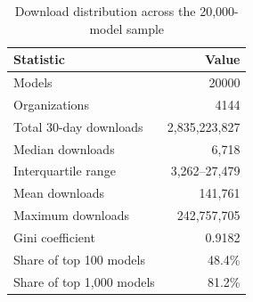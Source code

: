 \begin{table}[t]
\caption{Download distribution across the 20,000-model sample}
\label{tab:descriptives}
\centering
\small
\begin{tabular}{lr}
\toprule
Statistic & Value \\
\midrule
Models & 20000 \\
Organizations & 4144 \\
Total 30-day downloads & 2,835,223,827 \\
Median downloads & 6,718 \\
Interquartile range & 3,262--27,479 \\
Mean downloads & 141,761 \\
Maximum downloads & 242,757,705 \\
Gini coefficient & 0.9182 \\
Share of top 100 models & 48.4\% \\
Share of top 1,000 models & 81.2\% \\
\bottomrule
\end{tabular}
\normalsize
\end{table}
